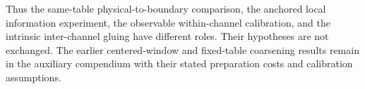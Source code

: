 Thus the same-table physical-to-boundary comparison, the anchored local
information experiment, the observable within-channel calibration, and the
intrinsic inter-channel gluing have different roles.  Their hypotheses are
not exchanged.  The earlier centered-window and fixed-table coarsening
results remain in the auxiliary compendium with their stated preparation
costs and calibration assumptions.
